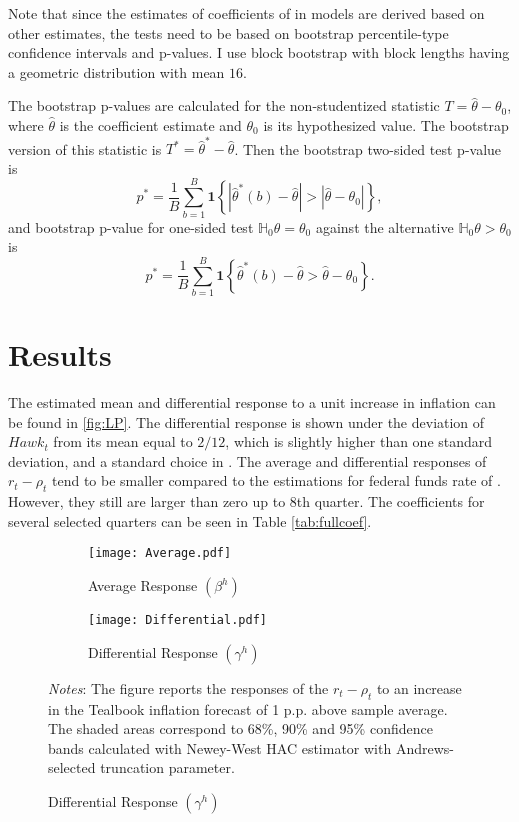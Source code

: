 \documentclass[12pt]{article}
\numberwithin{equation}{section}
\begin{document}
Note that since the estimates of coefficients of in models  are derived based on other estimates, the tests need to be based on bootstrap percentile-type confidence intervals and p-values.
I use block bootstrap with block lengths having a geometric distribution with mean $16$.

The bootstrap p-values are calculated for the non-studentized statistic $T=\hat\theta-\theta_0$, where $\hat\theta$ is the coefficient estimate and $\theta_0$ is its hypothesized value. 
The bootstrap version of this statistic is $T^*=\hat\theta^*-\hat\theta$. Then the bootstrap two-sided test p-value is
\[p^*=\frac{1}{B}\sum_{b=1}^B\mathbf{1}\left\{\left|\hat\theta^*(b)-\hat\theta\right|>\left|\hat\theta-\theta_0\right|\right\},\]
and bootstrap p-value for one-sided test $\mathbb{H}_0\theta=\theta_0$ against the alternative $\mathbb{H}_0\theta>\theta_0$ is 
\[p^*=\frac{1}{B}\sum_{b=1}^B\mathbf{1}\left\{\hat\theta^*(b)-\hat\theta >\hat\theta-\theta_0\right\}.\]




\section{Results}
The estimated mean and differential response to a unit increase in inflation can be found in \vref{fig:LP}. The differential response is shown under the deviation of $\mathit{Hawk}_t$ from its mean equal to $2/12$, which is slightly higher than one standard deviation, and a standard choice in \citet{HIM2023}. The average and differential responses of  $r_t-\rho_t$ tend to be smaller compared to the estimations for federal funds rate of \citet{HIM2023}. However, they still are larger than zero up to 8th quarter. The coefficients for several selected quarters can be seen in Table \vref{tab:fullcoef}. 

\begin{figure}[!htbp]\centering
    \caption{Policy Response to Inflation and FOMC Hawkishness}\vspace{2ex}
    \label{fig:LP}
    \begin{subfigure}[b]{0.49\textwidth}
        \centering
        \caption{Average Response $(\beta^h)$}
        \label{fig:y equals x}
        \texttt{[image: Average.pdf]}
    \end{subfigure}
    \hfill
    \begin{subfigure}[b]{0.49\textwidth}
        \centering
        \caption{Differential Response $(\gamma^h)$}
        \label{fig:DifferentialResponce}
        \texttt{[image: Differential.pdf]}
    \end{subfigure}
        {\begin{flushleft}\scriptsize\textit{Notes}: The figure reports the responses of the $r_t-\rho_t$ to an increase in the Tealbook inflation forecast of 1 p.p. above sample average. The shaded areas correspond to 68\%, 90\% and 95\% confidence bands calculated with Newey-West HAC estimator with Andrews-selected truncation parameter.\end{flushleft}}
\end{figure}
\end{document}
